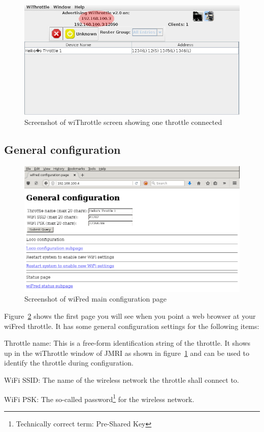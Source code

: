 \documentclass[11pt,a4paper]{scrartcl}
\begin{document}
\begin{figure}[tbh]
  \centering
  \includegraphics[width=0.8 \textwidth]{images/withrottle_Screenshot}
  \caption{Screenshot of wiThrottle screen showing one throttle connected}
  \label{withrottleScreenshot}
\end{figure}

\subsection{General configuration} \label{throttle_GeneralConf}

\begin{figure}[tbh]
  \centering
  \includegraphics[width=0.8 \textwidth]{images/screenShot_main}
  \caption{Screenshot of wiFred main configuration page}
  \label{throttleConfMainPage}
\end{figure}

Figure~\ref{throttleConfMainPage} shows the first page you will see when you point a web browser at your wiFred throttle. It has some general configuration settings for the following items:

\begin{description}
\item{Throttle name:} This is a free-form identification string of the throttle. It shows up in the wiThrottle window of JMRI as shown in figure~\ref{withrottleScreenshot} and can be used to identify the throttle during configuration.
\item{WiFi SSID:} The name of the wireless network the throttle shall connect to.
\item{WiFi PSK:} The so-called password\footnote{Technically correct term: Pre-Shared Key} for the wireless network.  
\end{description}
\end{document}
